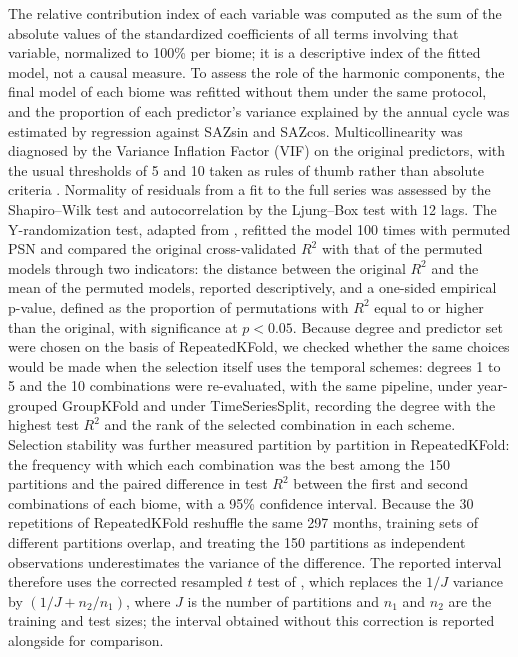 \documentclass[a4paper,fleqn]{cas-sc}
\begin{document}
The relative contribution index of each variable was computed as the sum of the absolute values of the standardized coefficients of all terms involving that variable, normalized to 100\% per biome; it is a descriptive index of the fitted model, not a causal measure. To assess the role of the harmonic components, the final model of each biome was refitted without them under the same protocol, and the proportion of each predictor's variance explained by the annual cycle was estimated by regression against SAZsin and SAZcos. Multicollinearity was diagnosed by the Variance Inflation Factor (VIF) on the original predictors, with the usual thresholds of 5 and 10 taken as rules of thumb rather than absolute criteria \citep{obrien2007}. Normality of residuals from a fit to the full series was assessed by the Shapiro--Wilk test and autocorrelation by the Ljung--Box test with 12 lags. The Y-randomization test, adapted from \citet{guimaraes2024}, refitted the model 100 times with permuted PSN and compared the original cross-validated $R^2$ with that of the permuted models through two indicators: the distance between the original $R^2$ and the mean of the permuted models, reported descriptively, and a one-sided empirical p-value, defined as the proportion of permutations with $R^2$ equal to or higher than the original, with significance at $p < 0.05$. Because degree and predictor set were chosen on the basis of RepeatedKFold, we checked whether the same choices would be made when the selection itself uses the temporal schemes: degrees 1 to 5 and the 10 combinations were re-evaluated, with the same pipeline, under year-grouped GroupKFold and under TimeSeriesSplit, recording the degree with the highest test $R^2$ and the rank of the selected combination in each scheme. Selection stability was further measured partition by partition in RepeatedKFold: the frequency with which each combination was the best among the 150 partitions and the paired difference in test $R^2$ between the first and second combinations of each biome, with a 95\% confidence interval. Because the 30 repetitions of RepeatedKFold reshuffle the same 297 months, training sets of different partitions overlap, and treating the 150 partitions as independent observations underestimates the variance of the difference. The reported interval therefore uses the corrected resampled $t$ test of \citet{nadeau2003}, which replaces the $1/J$ variance by $(1/J + n_2/n_1)$, where $J$ is the number of partitions and $n_1$ and $n_2$ are the training and test sizes; the interval obtained without this correction is reported alongside for comparison.
\end{document}
